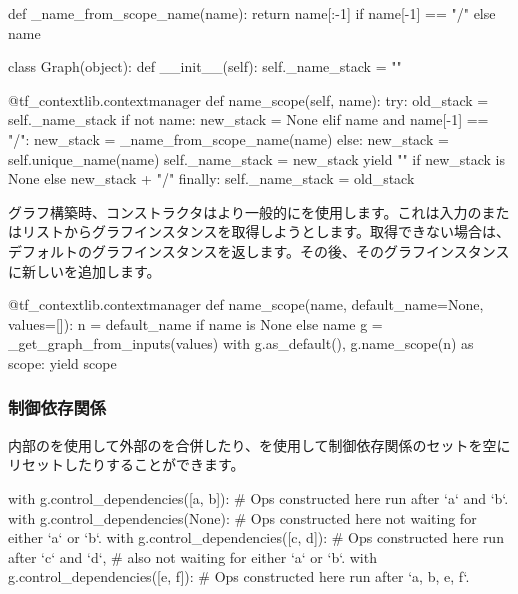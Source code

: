 \begin{content}
\begin{leftbar}
\begin{python}
def _name_from_scope_name(name):
  return name[:-1] if name[-1] == "/" else name

class Graph(object):
  def __init__(self):
    self._name_stack = ""

  @tf_contextlib.contextmanager
  def name_scope(self, name):
    try:
      old_stack = self._name_stack
      if not name:
        new_stack = None
      elif name and name[-1] == "/":
        new_stack = _name_from_scope_name(name)
      else:
        new_stack = self.unique_name(name)
      self._name_stack = new_stack
      yield "" if new_stack is None else new_stack + "/"
    finally:
      self._name_stack = old_stack
\end{python}
\end{leftbar}

グラフ構築時、コンストラクタはより一般的にを使用します。これは入力のまたはリストからグラフインスタンスを取得しようとします。取得できない場合は、デフォルトのグラフインスタンスを返します。その後、そのグラフインスタンスに新しいを追加します。

\begin{leftbar}
\begin{python}
@tf_contextlib.contextmanager
def name_scope(name, default_name=None, values=[]):
  n = default_name if name is None else name
  g = _get_graph_from_inputs(values)
  with g.as_default(), g.name_scope(n) as scope:
    yield scope
\end{python}
\end{leftbar}

\subsubsection{制御依存関係}

内部のを使用して外部のを合併したり、を使用して制御依存関係のセットを空にリセットしたりすることができます。

\begin{leftbar}
\begin{python}
with g.control_dependencies([a, b]):
  # Ops constructed here run after `a` and `b`.
  with g.control_dependencies(None):
    # Ops constructed here not waiting for either `a` or `b`.
    with g.control_dependencies([c, d]):
      # Ops constructed here run after `c` and `d`, 
      # also not waiting for either `a` or `b`.
  with g.control_dependencies([e, f]):
    # Ops constructed here run after `a, b, e, f`.
\end{python}
\end{leftbar}


\end{content}
